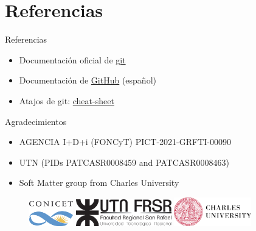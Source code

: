 \documentclass{beamer}
\begin{document}
  
  \section{Referencias}

  \begin{frame}{Referencias}
  
    \begin{itemize}
      
      \item Documentación oficial de \href{https://git-scm.com}{git} 
      \item Documentación de \href{https://docs.github.com/es}{GitHub} (español)
      \item Atajos de git: \href{https://training.github.com/downloads/es_ES/github-git-cheat-sheet/}{cheat-sheet}
    \end{itemize}
  
  \end{frame}

  \begin{frame} {Agradecimientos}
    \begin{itemize}
      
      \item AGENCIA I+D+i (FONCyT) PICT-2021-GRFTI-00090 
      \item UTN (PIDs PATCASR0008459 and PATCASR0008463)
      \item Soft Matter group from Charles University 

    \end{itemize}
    
    \begin{figure}
      \includegraphics[width=0.17\textwidth]{images/logo_conicet.png}
      \includegraphics[width=0.37\textwidth]{images/Logo_UTN.png}
      \includegraphics[width=0.3\textwidth]{images/logo_charles.png}
    \end{figure}

  \end{frame}
\end{document}
